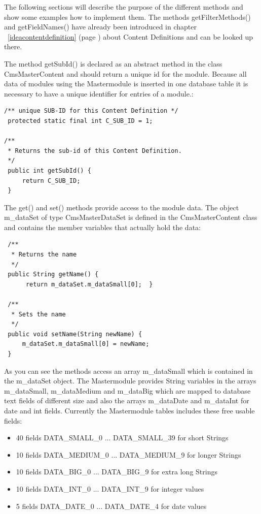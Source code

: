 The following sections will describe the purpose of the different methods
and show some examples how to implement them. The methods {\meth getFilterMethods()} and {\meth getFieldNames()} 
have already been introduced in chapter ~\ref{ideacontentdefinition} 
(page \pageref{ideacontentdefinition}) about Content Definitions and can be looked up there.

The method {\name getSubId()} is declared as an abstract method in the class 
{\class CmsMasterContent} and should return a unique id for the module. Because 
all data of modules using the Mastermodule is inserted in one database table it
is necessary to have a unique identifier for entries of a module.:

\begin{verbatim}
/** unique SUB-ID for this Content Definition */
 protected static final int C_SUB_ID = 1;

/**
 * Returns the sub-id of this Content Definition.
 */
 public int getSubId() {
     return C_SUB_ID;
 }
\end{verbatim}

The {\name get()} and {\name set()} methods provide access to the module data. 
The object m\_dataSet of type {\class CmsMasterDataSet} is defined in the {\class CmsMasterContent}
class and contains the member variables that actually hold the data:

\begin{verbatim}
 /**
  * Returns the name
  */
 public String getName() {
      return m_dataSet.m_dataSmall[0];  }

 /**
  * Sets the name
  */
 public void setName(String newName) {
     m_dataSet.m_dataSmall[0] = newName;
 }
\end{verbatim}

As you can see the methods access an array {\name m\_dataSmall} which is contained
in the {\name m\_dataSet} object. The Mastermodule provides String variables in the 
arrays {\name m\_dataSmall}, {\name m\_dataMedium} and {\name m\_dataBig}
which are mapped to database text fields of different size 
and also the arrays {\name m\_dataDate} and {\name m\_dataInt} for date and int fields.
Currently the Mastermodule tables includes these free usable fields:

\begin{itemize}
\item 40 fields DATA\_SMALL\_0  ... DATA\_SMALL\_39 for short Strings
\item 10 fields DATA\_MEDIUM\_0 ... DATA\_MEDIUM\_9 for longer Strings
\item 10 fields DATA\_BIG\_0    ... DATA\_BIG\_9 for extra long Strings
\item 10 fields DATA\_INT\_0    ... DATA\_INT\_9 for integer values
\item 5  fields DATA\_DATE\_0   ... DATA\_DATE\_4 for date values
\end{itemize}

